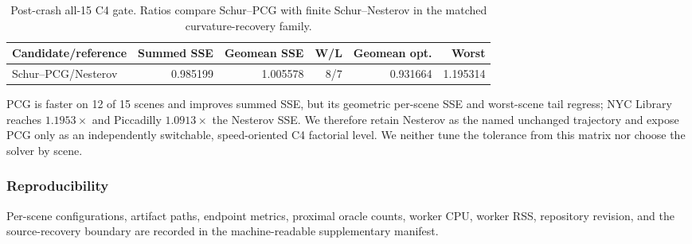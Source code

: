 \begin{table}[t]
  \centering
  \caption{Post-crash all-15 C4 gate.  Ratios compare Schur--PCG with finite
  Schur--Nesterov in the matched curvature-recovery family.}
  \label{tab:stage-c-c4-all15}
  \small
  \begin{tabular}{lrrrrr}
    \hline
    Candidate/reference & Summed SSE & Geomean SSE & W/L & Geomean opt. & Worst \\
    \hline
    Schur--PCG/Nesterov & 0.985199 & 1.005578 & 8/7 & 0.931664 & 1.195314 \\
    \hline
  \end{tabular}
\end{table}

PCG is faster on 12 of 15 scenes and improves summed SSE, but its geometric
per-scene SSE and worst-scene tail regress; NYC Library reaches $1.1953\times$
and Piccadilly $1.0913\times$ the Nesterov SSE.  We therefore retain Nesterov
as the named unchanged trajectory and expose PCG only as an independently
switchable, speed-oriented C4 factorial level.  We neither tune the tolerance
from this matrix nor choose the solver by scene.

\subsubsection*{Reproducibility}
Per-scene configurations, artifact paths, endpoint metrics, proximal oracle
counts, worker CPU, worker RSS, repository revision, and the source-recovery
boundary are recorded in the machine-readable supplementary manifest.